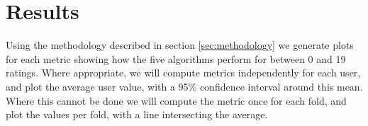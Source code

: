 \documentclass[letterpaper]{sig-alternate}
\begin{document}
  


  


\section{Results}

  Using the methodology described in section \ref{sec:methodology} we generate plots for each metric showing how the five algorithms perform for between 0 and 19 ratings.
  Where appropriate, we will compute metrics independently for each user, and plot the average user value, with a 95\% confidence interval around this mean.
  Where this cannot be done we will compute the metric once for each fold, and plot the values per fold, with a line intersecting the average.
\end{document}
